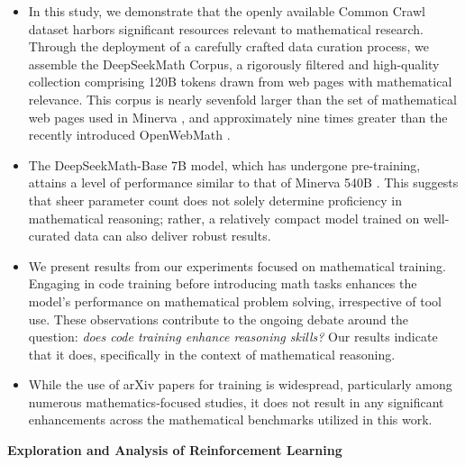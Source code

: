 \begin{itemize}[topsep=0pt]
    \item In this study, we demonstrate that the openly available Common Crawl dataset harbors significant resources relevant to mathematical research. Through the deployment of a carefully crafted data curation process, we assemble the DeepSeekMath Corpus, a rigorously filtered and high-quality collection comprising 120B tokens drawn from web pages with mathematical relevance. This corpus is nearly sevenfold larger than the set of mathematical web pages used in Minerva \citep{minerva}, and approximately nine times greater than the recently introduced OpenWebMath \citep{openwebmath}.

\item The DeepSeekMath-Base 7B model, which has undergone pre-training, attains a level of performance similar to that of Minerva 540B \citep{minerva}. This suggests that sheer parameter count does not solely determine proficiency in mathematical reasoning; rather, a relatively compact model trained on well-curated data can also deliver robust results.

\item We present results from our experiments focused on mathematical training. Engaging in code training before introducing math tasks enhances the model's performance on mathematical problem solving, irrespective of tool use. These observations contribute to the ongoing debate around the question: \textit{does code training enhance reasoning skills?} Our results indicate that it does, specifically in the context of mathematical reasoning.

\item While the use of arXiv papers for training is widespread, particularly among numerous mathematics-focused studies, it does not result in any significant enhancements across the mathematical benchmarks utilized in this work.
\end{itemize}

\textbf{Exploration and Analysis of Reinforcement Learning}

